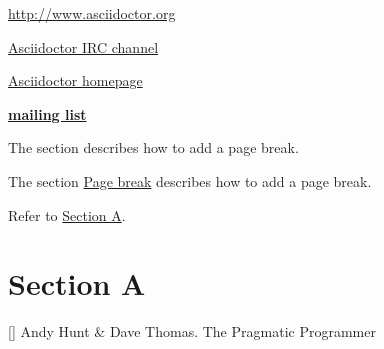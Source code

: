 \href{http://www.asciidoctor.org}{http://www.asciidoctor.org}

\href{irc://irc.freenode.org/#asciidoctor}{Asciidoctor IRC channel}

\href{view-source:asciidoctor.org}{Asciidoctor homepage}

\href{http://discuss.asciidoctor.org/}{\textbf{mailing list}}

The section \hyperlink{page-break}{} describes how to add a page break.

The section \hyperlink{page-break}{Page break} describes how to add a page break.

Refer to \hyperlink{x-section-a}{Section A}.
\hypertarget{x-section-a}{\section*{Section A}}

[\label{prag}] Andy Hunt & Dave Thomas. The Pragmatic Programmer
